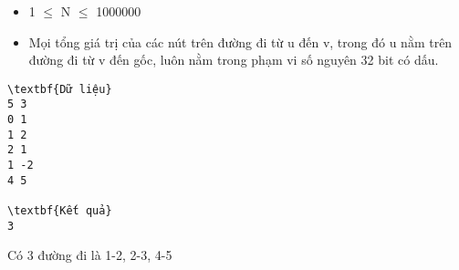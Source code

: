 \begin{itemize}
	\item     1  $\le$  N  $\le$  1000000   
	\item     Mọi tổng giá trị của các nút trên đường đi từ u đến v, trong đó u nằm trên đường đi từ v đến gốc, luôn nằm trong phạm vi số nguyên 32 bit có dấu.   
\end{itemize}
\begin{verbatim}
\textbf{Dữ liệu}
5 3
0 1
1 2
2 1
1 -2
4 5

\textbf{Kết quả}
3
\end{verbatim}
Có 3 đường đi là 1-2, 2-3, 4-5